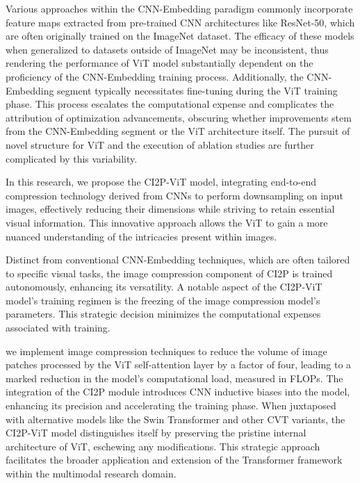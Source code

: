 Various approaches within the CNN-Embedding paradigm commonly incorporate feature maps extracted from pre-trained CNN architectures like ResNet-50, 
which are often originally trained on the ImageNet dataset. The efficacy of these models when generalized to datasets outside of ImageNet may be inconsistent, 
thus rendering the performance of ViT model substantially dependent on the proficiency of the CNN-Embedding training process.
Additionally, the CNN-Embedding segment typically necessitates fine-tuning during the ViT training phase. 
This process escalates the computational expense and complicates the attribution of optimization advancements, 
obscuring whether improvements stem from the CNN-Embedding segment or the ViT architecture itself.
The pursuit of novel structure for ViT and the execution of ablation studies are further complicated by this variability. 

In this research, we propose the CI2P-ViT model, integrating end-to-end compression technology derived from CNNs to perform downsampling on input images, 
effectively reducing their dimensions while striving to retain essential visual information. 
This innovative approach allows the ViT to gain a more nuanced understanding of the intricacies present within images.

Distinct from conventional CNN-Embedding techniques, which are often tailored to specific visual tasks, 
the image compression component of CI2P is trained autonomously, enhancing its versatility. 
A notable aspect of the CI2P-ViT model's training regimen is the freezing of the image compression model's parameters. 
This strategic decision minimizes the computational expenses associated with training.

we implement image compression techniques to reduce the volume of image patches processed by the ViT self-attention layer by a factor of four, 
leading to a marked reduction in the model's computational load, measured in FLOPs. 
The integration of the CI2P module introduces CNN inductive biases into the model, enhancing its precision and accelerating the training phase.
When juxtaposed with alternative models like the Swin Transformer and other CVT variants, 
the CI2P-ViT model distinguishes itself by preserving the pristine internal architecture of ViT, eschewing any modifications. 
This strategic approach facilitates the broader application and extension of the Transformer framework within the multimodal research domain.